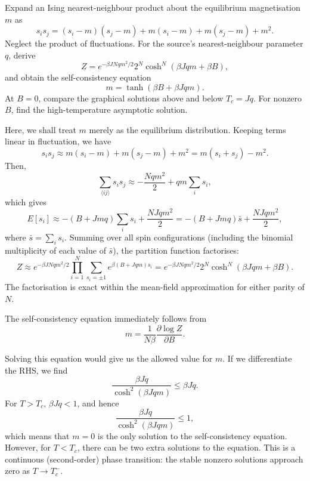 Expand an Ising nearest-neighbour product about the equilibrium magnetisation
$m$ as
\begin{equation}
    s_i s_j=(s_i-m)(s_j-m)+m(s_i-m)+m(s_j-m)+m^2.
\end{equation}
Neglect the product of fluctuations. For the source's nearest-neighbour
parameter $q$, derive
\begin{equation}
    Z=e^{-\beta JNqm^2/2}
    2^N\cosh^N(\beta Jqm+\beta B),
\end{equation}
and obtain the self-consistency equation
\begin{equation}
    m=\tanh(\beta B+\beta Jqm).
\end{equation}
At $B=0$, compare the graphical solutions above and below $T_c=Jq$.
For nonzero $B$, find the high-temperature asymptotic solution.
\begin{solution}
    Here, we shall treat $m$ merely as the equilibrium distribution. Keeping terms linear in fluctuation, we have
    \begin{equation}
        s_i s_j \approx m(s_i-m)+m(s_j-m)+m^2 =m(s_i +s_j)  - m^2.
    \end{equation}
    Then,
    \begin{equation}
        \sum_{\langle ij\rangle}s_i s_j \approx -\frac{Nqm^2}{2}+qm\sum_i s_i,
    \end{equation}
    which gives
    \begin{equation}
        E[s_i] \approx  -(B+Jmq)\sum_i s_i + \frac{NJqm^2}{2} = -(B+Jmq)\bar s  +  \frac{NJqm^2}{2},
    \end{equation}
    where $\bar s = \sum_i s_i$. Summing over all spin configurations (including the binomial multiplicity of each value of $\bar s$), the partition function factorises:
    \begin{equation}
        Z \approx e^{-\beta JNqm^2/2}\prod_{i=1}^{N}\sum_{s_i=\pm1}e^{\beta(B+Jqm)s_i}
        =e^{-\beta JNqm^2/2}2^N\cosh^N(\beta Jqm+\beta B).
    \end{equation}
    The factorisation is exact within the mean-field approximation for either parity of $N$.

    The self-consistency equation immediately follows from
    \begin{equation}
        m = \frac{1}{N\beta}\frac{\partial \log Z}{\partial B}.
    \end{equation}

    Solving this equation would give us the allowed value for $m$. If we differentiate the RHS, we find
    \begin{equation}
        \frac{\beta Jq}{\cosh^2(\beta J qm)} \leq   \beta J q.
    \end{equation}
    For $T > T_c$, $\beta Jq <1$, and hence
    \begin{equation}
        \frac{\beta Jq}{\cosh^2(\beta J qm)} \leq 1,
    \end{equation}
    which means that $m = 0$ is the only solution to the self-consistency equation. However, for $T < T_c$, there can be two extra solutions to the equation. This is a continuous (second-order) phase transition: the stable nonzero solutions approach zero as $T\to T_c^-$.


\end{solution}

